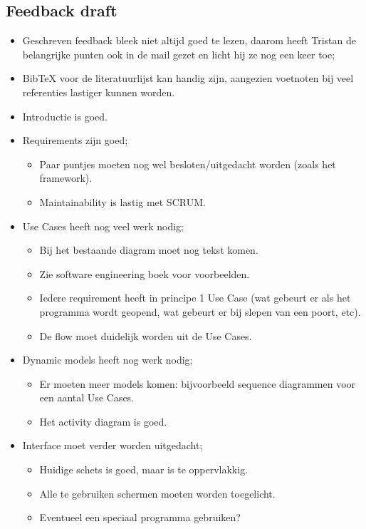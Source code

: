 \documentclass[a4paper]{article}
\begin{document}
\subsection{Feedback draft}
\begin{itemize}
\renewcommand{\labelitemi}{$\bullet$}
\item Geschreven feedback bleek niet altijd goed te lezen, daarom heeft Tristan de belangrijke punten ook in de mail gezet en licht hij ze nog een keer toe;
\item BibTeX voor de literatuurlijst kan handig zijn, aangezien voetnoten bij veel referenties lastiger kunnen worden.
\item Introductie is goed.

\item Requirements zijn goed;
\begin{itemize}
\item Paar puntjes moeten nog wel besloten/uitgedacht worden (zoals het framework).
\item Maintainability is lastig met SCRUM. 
\end{itemize}

\item Use Cases heeft nog veel werk nodig;
\begin{itemize}
\item Bij het bestaande diagram moet nog tekst komen.
\item Zie software engineering boek voor voorbeelden.
\item Iedere requirement heeft in principe 1 Use Case (wat gebeurt er als het programma wordt geopend, wat gebeurt er bij slepen van een poort, etc).
\item De flow moet duidelijk worden uit de Use Cases.
\end{itemize}

\item Dynamic models heeft nog werk nodig;
\begin{itemize}
\item Er moeten meer models komen: bijvoorbeeld sequence diagrammen voor een aantal Use Cases.
\item Het activity diagram is goed.
\end{itemize}

\item Interface moet verder worden uitgedacht;
\begin{itemize}
\item Huidige schets is goed, maar is te oppervlakkig.
\item Alle te gebruiken schermen moeten worden toegelicht.
\item Eventueel een speciaal programma gebruiken?
\end{itemize}

\end{itemize}
\end{document}
